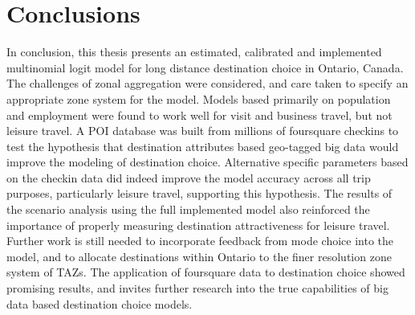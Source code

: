 \section{Conclusions}
In conclusion, this thesis presents an estimated, calibrated and implemented multinomial logit model for long distance destination choice in Ontario, Canada. The challenges of zonal aggregation were considered, and care taken to specify an appropriate zone system for the model. Models based primarily on population and employment were found to work well for visit and business travel, but not leisure travel. A POI database was built from millions of foursquare checkins to test the hypothesis that destination attributes based geo-tagged big data would improve the modeling of destination choice. Alternative specific parameters based on the checkin data did indeed improve the model accuracy across all trip purposes, particularly leisure travel, supporting this hypothesis. The results of the scenario analysis using the full implemented model also reinforced the importance of properly measuring destination attractiveness for leisure travel. Further work is still needed to incorporate feedback from mode choice into the model, and to allocate destinations within Ontario to the finer resolution zone system of TAZs. The application of foursquare data to destination choice showed promising results, and invites further research into the true capabilities of big data based destination choice models.
